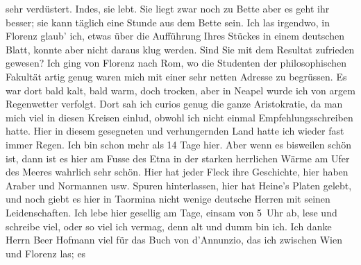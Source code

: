 \begin{ledgroupsized}[t]{13cm}
               sehr {\pb}verdüstert. Indes, sie lebt. Sie liegt zwar noch zu Bette aber es geht ihr
                    besser; sie kann täglich eine Stunde aus dem Bette sein.\pend
           \pstart
           Ich las irgendwo, in Florenz glaub’ ich,
                    etwas über die Aufführung Ihres Stückes in
                    einem deutschen Blatt, konnte aber nicht daraus klug werden. Sind Sie mit dem
                    Resultat zufrieden gewesen?\pend
           \pstart
           Ich ging von Florenz nach Rom, wo die Studenten der philosophischen Fakultät artig genug waren mich mit einer sehr
                    netten Adresse zu begrüssen. Es war dort bald kalt, bald warm, doch trocken,
                    aber in Neapel wurde ich von argem
                    Regenwetter verfolgt. Dort sah ich curios genug die ganze Aristokratie, da man
                    mich {\pb}viel in diesen Kreisen
                    einlud, obwohl ich nicht einmal Empfehlungsschreiben hatte.\pend
           \pstart
           Hier in diesem gesegneten und verhungernden Land hatte ich wieder fast immer
                    Regen. Ich bin schon mehr als 14 Tage hier. Aber wenn es bisweilen schön ist,
                    dann ist es hier am Fusse des Etna in der
                    starken herrlichen Wärme am Ufer des Meeres wahrlich sehr schön. Hier hat jeder
                    Fleck ihre Geschichte, hier haben Araber und Normannen usw. Spuren hinterlassen,
                    hier hat Heine’s Platen gelebt, und noch giebt es hier in Taormina nicht wenige deutsche Herren mit seinen
                    Leidenschaften.\pend
           \pstart
           Ich lebe hier gesellig am Tage, einsam {\pb}von 5 Uhr ab, lese und
                    schreibe viel, oder so viel ich vermag, denn alt und dumm bin ich.\pend
           \pstart
           Ich danke Herrn Beer Hofmann viel für das Buch von d’Annunzio, das ich zwischen Wien und Florenz las; es

\end{ledgroupsized}
